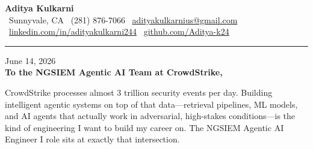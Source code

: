 \documentclass[11pt,letterpaper]{article}
\begin{document}
\begin{center}
    {\Huge \textbf{\color{CrowdStrikeRed} Aditya Kulkarni}}\\[8pt]
    {\color{DarkGrey} \small
    \faMapMarker* \ Sunnyvale, CA \quad \textbar \quad
    \faPhone \ (281) 876-7066 \quad \textbar \quad
    \faEnvelope \ \href{mailto:adityakulkarnius@gmail.com}{adityakulkarnius@gmail.com} \\[4pt]
    \faLinkedin \ \href{https://linkedin.com/in/adityakulkarni244}{linkedin.com/in/adityakulkarni244} \quad \textbar \quad
    \faGithub \ \href{https://github.com/Aditya-k24}{github.com/Aditya-k24}
    }
\end{center}

\vspace{-4pt}
{\color{CrowdStrikeRed}\rule{\linewidth}{1.5pt}}
\vspace{10pt}

June 14, 2026\\[10pt]
\textbf{To the NGSIEM Agentic AI Team at CrowdStrike,}

\vspace{6pt}

CrowdStrike processes almost 3 trillion security events per day. Building intelligent agentic systems on top of that data---retrieval pipelines, ML models, and AI agents that actually work in adversarial, high-stakes conditions---is the kind of engineering I want to build my career on. The NGSIEM Agentic AI Engineer I role sits at exactly that intersection.

\vspace{4pt}
\end{document}

